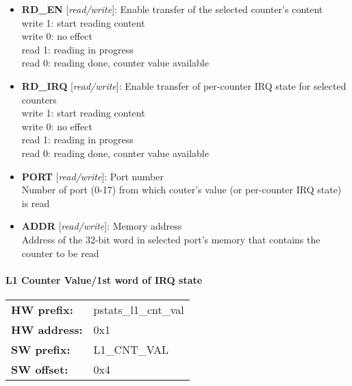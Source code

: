 \begin{itemize}
\item \begin{small}
{\bf 
RD\_EN
} [\emph{read/write}]: Enable transfer of the selected counter's content
\\
write 1: start reading content \\                      write 0: no effect \\                      read  1: reading in progress \\                      read  0: reading done, counter value available
\end{small}
\item \begin{small}
{\bf 
RD\_IRQ
} [\emph{read/write}]: Enable transfer of per-counter IRQ state for selected counters
\\
write 1: start reading content \\                      write 0: no effect \\                      read  1: reading in progress \\                      read  0: reading done, counter value available
\end{small}
\item \begin{small}
{\bf 
PORT
} [\emph{read/write}]: Port number
\\
Number of port (0-17) from which couter's value (or per-counter IRQ state) is read
\end{small}
\item \begin{small}
{\bf 
ADDR
} [\emph{read/write}]: Memory address
\\
Address of the 32-bit word in selected port's memory that contains the counter to be read
\end{small}
\end{itemize}
\paragraph*{L1 Counter Value/1st word of IRQ state}\vspace{12pt}

\begin{tabular}{l l }
{\bf HW prefix:}  & pstats\_l1\_cnt\_val\\
{\bf HW address:}  & 0x1\\
{\bf SW prefix:}  & L1\_CNT\_VAL\\
{\bf SW offset:}  & 0x4\\
\end{tabular}

